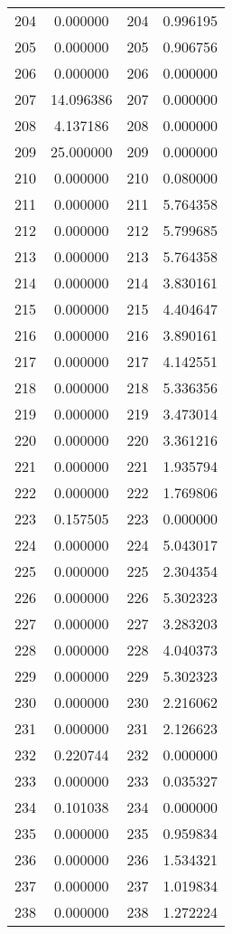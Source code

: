 \documentclass[12pt]{article}
\begin{document}
\begin{longtable}{@{}cccc@{}}
204 & 0.000000 & 204 & 0.996195 \\
205 & 0.000000 & 205 & 0.906756 \\
206 & 0.000000 & 206 & 0.000000 \\
207 & 14.096386 & 207 & 0.000000 \\
208 & 4.137186 & 208 & 0.000000 \\
209 & 25.000000 & 209 & 0.000000 \\
210 & 0.000000 & 210 & 0.080000 \\
211 & 0.000000 & 211 & 5.764358 \\
212 & 0.000000 & 212 & 5.799685 \\
213 & 0.000000 & 213 & 5.764358 \\
214 & 0.000000 & 214 & 3.830161 \\
215 & 0.000000 & 215 & 4.404647 \\
216 & 0.000000 & 216 & 3.890161 \\
217 & 0.000000 & 217 & 4.142551 \\
218 & 0.000000 & 218 & 5.336356 \\
219 & 0.000000 & 219 & 3.473014 \\
220 & 0.000000 & 220 & 3.361216 \\
221 & 0.000000 & 221 & 1.935794 \\
222 & 0.000000 & 222 & 1.769806 \\
223 & 0.157505 & 223 & 0.000000 \\
224 & 0.000000 & 224 & 5.043017 \\
225 & 0.000000 & 225 & 2.304354 \\
226 & 0.000000 & 226 & 5.302323 \\
227 & 0.000000 & 227 & 3.283203 \\
228 & 0.000000 & 228 & 4.040373 \\
229 & 0.000000 & 229 & 5.302323 \\
230 & 0.000000 & 230 & 2.216062 \\
231 & 0.000000 & 231 & 2.126623 \\
232 & 0.220744 & 232 & 0.000000 \\
233 & 0.000000 & 233 & 0.035327 \\
234 & 0.101038 & 234 & 0.000000 \\
235 & 0.000000 & 235 & 0.959834 \\
236 & 0.000000 & 236 & 1.534321 \\
237 & 0.000000 & 237 & 1.019834 \\
238 & 0.000000 & 238 & 1.272224 \\

\end{longtable}
\end{document}
